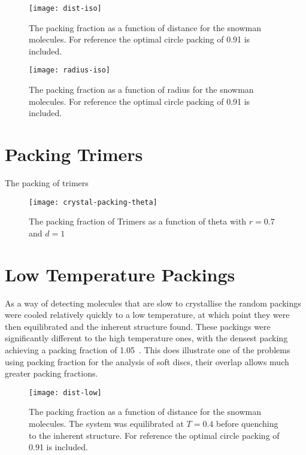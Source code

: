 \begin{figure}
    \centering
    \texttt{[image: dist-iso]}
    \caption[Crystalline packing of Snowmen as a function of distance]{The packing fraction as a function of distance for the snowman molecules. For reference the optimal circle packing of 0.91 is included.}
    \label{fig:snowman dist iso}
\end{figure}

\begin{figure}
    \centering
    \texttt{[image: radius-iso]}
    \caption[Crystal packig of Snowmen as a function of radius]{The packing fraction as a function of radius for the snowman molecules. For reference the optimal circle packing of 0.91 is included.}
    \label{fig:snowman radius iso}
\end{figure}


\section{Packing Trimers}

The packing of trimers



\begin{figure}
    \texttt{[image: crystal-packing-theta]}
    \caption{The packing fraction of Trimers as a function of theta with $r=0.7$ and $d=1$}
    \label{fig:crystal packing theta}
\end{figure}

\section{Low Temperature Packings}

As a way of detecting molecules that are slow to crystallise the random packings were cooled relatively quickly to a low temperature, at which point they were then equilibrated and the inherent structure found. These packings were significantly different to the high temperature ones, with the densest packing achieving a packing fraction of 1.05\tocheck~. This does illustrate one of the problems using packing fraction for the analysis of soft discs, their overlap allows much greater packing fractions.


\begin{figure}
    \centering
    \texttt{[image: dist-low]}
    \caption[Packing fraction of snowmen as a function of distance ($T=0.4$)]{The packing fraction as a function of distance for the snowman molecules. The system was equilibrated at $T=0.4$ before quenching to the inherent structure. For reference the optimal circle packing of 0.91 is included.}
    \label{fig:snowman dist low}
\end{figure}


